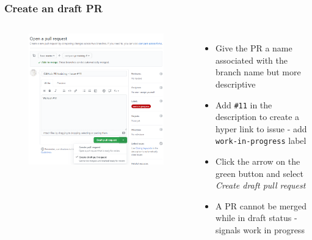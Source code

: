 \documentclass[aspectratio=169]{beamer} %
\begin{document}
\begin{frame}
	\frametitle{Create an draft PR}
	\begin{columns}[c]
		
		\vspace{-.5cm}
		\begin{figure}
			\centering
			\includegraphics[width=\textwidth]{./img/create-pr-1.png}
		\end{figure}
		
		
		\begin{itemize}
			\setlength\itemsep{.5em}
			\item Give the PR a name associated with the branch name but more descriptive
			\item Add \texttt{\#11} in the description to create a hyper link to issue - add \texttt{work-in-progress} label
			\item Click the arrow on the green button and select \textit{Create draft pull request}
			\item A PR cannot be merged while in draft status - signals work in progress
		\end{itemize}
		
	\end{columns}	
\end{frame}
\end{document}
